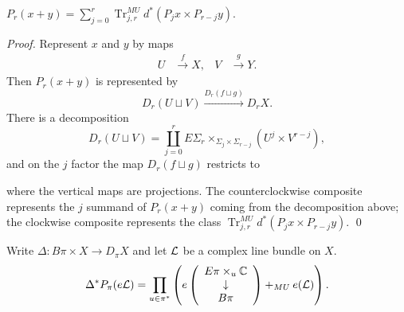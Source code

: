\begin{lemma}
$P_r(x + y) = \sum_{j=0}^r \operatorname{Tr}_{j,r}^{MU} d^*(P_j x \times P_{r-j}y)$.

\end{lemma}
\begin{proof}
Represent $x$ and $y$ by maps
\begin{align*}
U & \xrightarrow{f} X, &
V & \xrightarrow{g} Y.
\end{align*}
Then $P_r(x+y)$ is represented by \[D_r(U \sqcup V) \xrightarrow{D_r(f \sqcup g)} D_r X.\]  There is a decomposition \[D_r(U \sqcup V) = \coprod_{j=0}^r E\Sigma_r \times_{\Sigma_j \times \Sigma_{r-j}} (U^j \times V^{r-j}),\] and on the $j$ factor the map $D_r(f \sqcup g)$ restricts to
\begin{center}
\end{center}
where the vertical maps are projections.  The counterclockwise composite represents the $j$ summand of $P_r(x+y)$ coming from the decomposition above; the clockwise composite represents the class $\operatorname{Tr}_{j,r}^{MU} d^*(P_j x \times P_{r-j} y)$. \qed
\end{proof}


\begin{lemma}
Write $\Delta: B\pi \times X \to D_\pi X$ and let $\mathcal{L}$ be a complex line bundle on $X$.
\[\Delta^* P_\pi(e\mathcal{L}) = \prod_{u \in \pi^*} \left( e\left(\begin{array}{c} E\pi \times_u \mathbb{C} \\ \downarrow \\ B\pi \end{array} \right) +_{MU} e(\mathcal{L}) \right).\]
\end{lemma}

